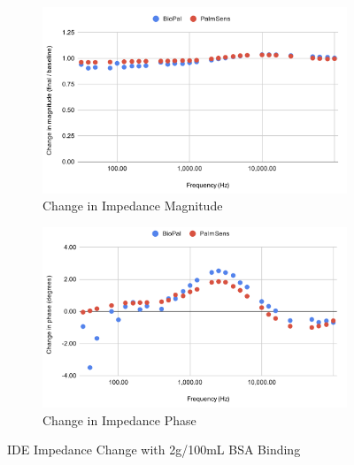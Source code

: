 \begin{figure}[H]
    \centering
    \begin{subfigure}{0.48\textwidth}
        \includegraphics[width=\textwidth]{2g:100mL mag.png}
        \caption{Change in Impedance Magnitude}
        \label{fig:2g_mag}
    \end{subfigure}
    \hfill
    \begin{subfigure}{0.48\textwidth}
        \includegraphics[width=\textwidth]{2g:100mL phase.png}
        \caption{Change in Impedance Phase}
        \label{fig:2g_phase}
    \end{subfigure}
    \caption{IDE Impedance Change with 2g/100mL BSA Binding}
    \label{fig:2g_bsa_comparison}
\end{figure}

